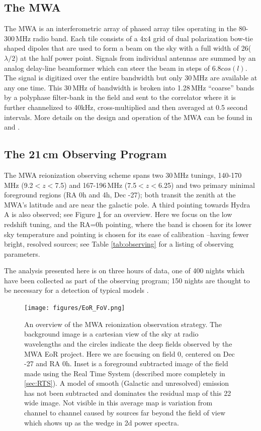 \documentclass[twolcolumn,iop]{emulateapj}
\begin{document}
\subsection{The MWA}
The MWA is an interferometric array of phased array tiles operating in the 80-300\,MHz radio band. Each tile consists of a 4x4 grid of dual polarization bow-tie shaped dipoles that are used to form a beam on the sky with a full width of 26\arcdeg($\lambda/2$) at the half power point. Signals from individual antennas are summed by an analog delay-line beamformer which can steer the beam in steps of 6.8\arcdeg$cos(l)$.  The signal is digitized over the entire bandwidth but only 30\,MHz are available at any one time.  This 30\,MHz of bandwidth is broken into 1.28\,MHz ``coarse'' bands by a polyphase filter-bank in the field and sent to the correlator \citep{Ord:2015PASA...32....6O} where it is further channelized to 40kHz, cross-multiplied and then averaged at 0.5 second intervals.  More details on the design and operation of the MWA can be found in \cite{Lonsdale:2009p7913} and \cite{Tingay:2013p9022}.


\subsection{The 21\,cm Observing Program}
The MWA reionization observing scheme spans two 30\,MHz tunings, 140-170\,MHz (9.2$<z<$7.5) and 167-196\,MHz (7.5$<z<$6.25) and two primary minimal foreground regions (RA 0h and 4h, Dec -27\arcdeg); both transit the zenith at the MWA's  latitude and are near the galactic pole. A third pointing towards Hydra A is also observed; see Figure \ref{fig:fields} for an overview. Here we focus on the low redshift tuning, and the RA=0h pointing, where the band is chosen for its lower sky temperature and pointing is chosen for its ease of calibration --having fewer bright, resolved sources; see Table \ref{tab:observing} for a listing of observing parameters.

The analysis presented here is on three hours of data, one of 400 nights which have been collected as part of the observing program; 150 nights are thought to be necessary for a detection of typical models \citep{Beardsley:2013p9952}.

\begin{figure}[htbp]
\begin{center}
\texttt{[image: figures/EoR\_FoV.png]}
\caption{An overview of the MWA reionization observation strategy. The background image is a cartesian view of the sky at radio wavelengths and the circles indicate the deep fields observed by the MWA EoR project.  Here we are focusing on field 0, centered on Dec -27\arcdeg{} and RA 0h. Inset is a foreground subtracted image of the field made using the Real Time System (described more completely in \ref{sec:RTS}). A model of smooth (Galactic and unresolved) emission has not been subtracted and dominates the residual map of this 22\arcdeg{} wide image. Not visible in this average map is variation from channel to channel caused by sources far beyond the field of view which shows up as the wedge in 2d power spectra.}
\label{fig:fields}
\end{center}
\end{figure}
\end{document}
